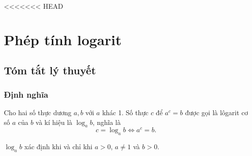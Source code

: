 <<<<<<< HEAD
\section{Phép tính logarit}
\subsection{Tóm tắt lý thuyết}
\begin{tomtat}
	\subsubsection{Định nghĩa}
	\begin{dn}
		Cho hai số thực dương $a, b$ với $a$ khác 1. Số thực $c$ để $a^{c}=b$ được gọi là lôgarit cơ số $a$ của $b$ và kí hiệu là $\log _{a} b$, nghĩa là
		$$c=\log _{a} b \Leftrightarrow a^{c}=b.$$
	\end{dn}
	\begin{note}
		$\log _{a} b$ xác định khi và chỉ khi $a>0$, $a \neq 1$ và $b>0$.
	\end{note}

\end{tomtat}
